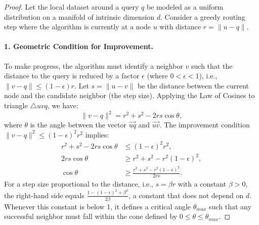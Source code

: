 \documentclass{article}
\theoremstyle{plain}
\theoremstyle{definition}
\theoremstyle{remark}
\begin{document}
\begin{proof}
Let the local dataset around a query $q$ be modeled as a uniform distribution on a manifold of intrinsic dimension $d$. Consider a greedy routing step where the algorithm is currently at a node $u$ with distance $r = \|u - q\|$.

\paragraph{1. Geometric Condition for Improvement.}
To make progress, the algorithm must identify a neighbor $v$ such that the distance to the query is reduced by a factor $\epsilon$ (where $0 < \epsilon < 1$), i.e., $\|v - q\| \le (1-\epsilon)r$.
Let $s = \|u - v\|$ be the distance between the current node and the candidate neighbor (the step size). Applying the Law of Cosines to triangle $\triangle u v q$, we have:
\begin{equation}
    \|v - q\|^2 = r^2 + s^2 - 2rs \cos \theta,
\end{equation}
where $\theta$ is the angle between the vector $\vec{u q}$ and $\vec{u v}$. The improvement condition $\|v - q\|^2 \le (1-\epsilon)^2 r^2$ implies:
\begin{align}
    r^2 + s^2 - 2rs \cos \theta &\le (1-\epsilon)^2 r^2, \nonumber \\
    2rs \cos \theta &\ge r^2 + s^2 - r^2(1-\epsilon)^2, \nonumber \\
    \cos \theta &\ge \frac{r^2 + s^2 - r^2(1-\epsilon)^2}{2rs}.
\end{align}
For a step size proportional to the distance, i.e., $s = \beta r$ with a constant $\beta > 0$, the right-hand side equals $\frac{1 - (1-\epsilon)^2 + \beta^2}{2\beta}$, a constant that does not depend on $d$. Whenever this constant is below 1, it defines a critical angle $\theta_{max}$ such that any successful neighbor must fall within the cone defined by $0 \le \theta \le \theta_{max}$.


\end{proof}
\end{document}
